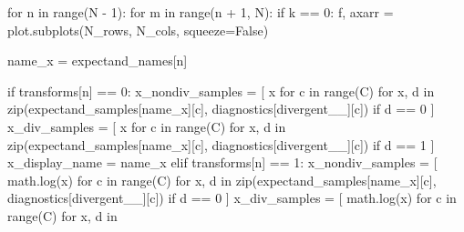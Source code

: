 \documentclass[
  letterpaper,
  DIV=11,
  numbers=noendperiod]{scrartcl}
\newenvironment{Shaded}{\begin{snugshade}}{\end{snugshade}}
\newcommand{\BuiltInTok}[1]{\textcolor[rgb]{0.00,0.23,0.31}{#1}}
\newcommand{\ControlFlowTok}[1]{\textcolor[rgb]{0.00,0.23,0.31}{#1}}
\newcommand{\DecValTok}[1]{\textcolor[rgb]{0.68,0.00,0.00}{#1}}
\newcommand{\KeywordTok}[1]{\textcolor[rgb]{0.00,0.23,0.31}{#1}}
\newcommand{\NormalTok}[1]{\textcolor[rgb]{0.00,0.23,0.31}{#1}}
\newcommand{\OperatorTok}[1]{\textcolor[rgb]{0.37,0.37,0.37}{#1}}
\newcommand{\StringTok}[1]{\textcolor[rgb]{0.13,0.47,0.30}{#1}}
\newcommand{\VariableTok}[1]{\textcolor[rgb]{0.07,0.07,0.07}{#1}}
\begin{document}
\begin{Shaded}
\begin{Highlighting}[]
  \ControlFlowTok{for}\NormalTok{ n }\KeywordTok{in} \BuiltInTok{range}\NormalTok{(N }\OperatorTok{{-}} \DecValTok{1}\NormalTok{):}
    \ControlFlowTok{for}\NormalTok{ m }\KeywordTok{in} \BuiltInTok{range}\NormalTok{(n }\OperatorTok{+} \DecValTok{1}\NormalTok{, N):}
      \ControlFlowTok{if}\NormalTok{ k }\OperatorTok{==} \DecValTok{0}\NormalTok{:}
\NormalTok{        f, axarr }\OperatorTok{=}\NormalTok{ plot.subplots(N\_rows, N\_cols, squeeze}\OperatorTok{=}\VariableTok{False}\NormalTok{)}
      
\NormalTok{      name\_x }\OperatorTok{=}\NormalTok{ expectand\_names[n]}
      
      \ControlFlowTok{if}\NormalTok{ transforms[n] }\OperatorTok{==} \DecValTok{0}\NormalTok{:}
\NormalTok{        x\_nondiv\_samples }\OperatorTok{=}\NormalTok{ [ x }\ControlFlowTok{for}\NormalTok{ c }\KeywordTok{in} \BuiltInTok{range}\NormalTok{(C) }\ControlFlowTok{for}\NormalTok{ x, d }\KeywordTok{in} 
                             \BuiltInTok{zip}\NormalTok{(expectand\_samples[name\_x][c], }
\NormalTok{                                 diagnostics[}\StringTok{\textquotesingle{}divergent\_\_\textquotesingle{}}\NormalTok{][c]) }
                             \ControlFlowTok{if}\NormalTok{ d }\OperatorTok{==} \DecValTok{0}\NormalTok{  ]}
\NormalTok{        x\_div\_samples }\OperatorTok{=}\NormalTok{ [ x }\ControlFlowTok{for}\NormalTok{ c }\KeywordTok{in} \BuiltInTok{range}\NormalTok{(C) }\ControlFlowTok{for}\NormalTok{ x, d }\KeywordTok{in} 
                          \BuiltInTok{zip}\NormalTok{(expectand\_samples[name\_x][c], }
\NormalTok{                              diagnostics[}\StringTok{\textquotesingle{}divergent\_\_\textquotesingle{}}\NormalTok{][c]) }
                          \ControlFlowTok{if}\NormalTok{ d }\OperatorTok{==} \DecValTok{1}\NormalTok{  ]}
\NormalTok{        x\_display\_name }\OperatorTok{=}\NormalTok{ name\_x}
      \ControlFlowTok{elif}\NormalTok{ transforms[n] }\OperatorTok{==} \DecValTok{1}\NormalTok{:}
\NormalTok{        x\_nondiv\_samples }\OperatorTok{=}\NormalTok{ [ math.log(x) }\ControlFlowTok{for}\NormalTok{ c }\KeywordTok{in} \BuiltInTok{range}\NormalTok{(C) }\ControlFlowTok{for}\NormalTok{ x, d }\KeywordTok{in} 
                             \BuiltInTok{zip}\NormalTok{(expectand\_samples[name\_x][c], }
\NormalTok{                                 diagnostics[}\StringTok{\textquotesingle{}divergent\_\_\textquotesingle{}}\NormalTok{][c]) }
                             \ControlFlowTok{if}\NormalTok{ d }\OperatorTok{==} \DecValTok{0}\NormalTok{  ]}
\NormalTok{        x\_div\_samples }\OperatorTok{=}\NormalTok{ [ math.log(x) }\ControlFlowTok{for}\NormalTok{ c }\KeywordTok{in} \BuiltInTok{range}\NormalTok{(C) }\ControlFlowTok{for}\NormalTok{ x, d }\KeywordTok{in} 

\end{Highlighting}
\end{Shaded}
\end{document}
